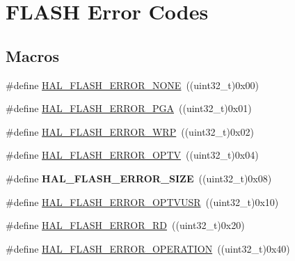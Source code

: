 \hypertarget{group___f_l_a_s_h___error___codes}{\section{F\-L\-A\-S\-H Error Codes}
\label{group___f_l_a_s_h___error___codes}
}
\subsection*{Macros}
\begin{DoxyCompactItemize}
\item 
\#define \hyperlink{group___f_l_a_s_h___error___codes_gae7fb9ee7198d393aba27ade3a9f50a70}{H\-A\-L\-\_\-\-F\-L\-A\-S\-H\-\_\-\-E\-R\-R\-O\-R\-\_\-\-N\-O\-N\-E}~((uint32\-\_\-t)0x00)
\item 
\#define \hyperlink{group___f_l_a_s_h___error___codes_gad9f62b6567543610f667bce580550662}{H\-A\-L\-\_\-\-F\-L\-A\-S\-H\-\_\-\-E\-R\-R\-O\-R\-\_\-\-P\-G\-A}~((uint32\-\_\-t)0x01)
\item 
\#define \hyperlink{group___f_l_a_s_h___error___codes_ga27e871d85f9311272098315bc3723075}{H\-A\-L\-\_\-\-F\-L\-A\-S\-H\-\_\-\-E\-R\-R\-O\-R\-\_\-\-W\-R\-P}~((uint32\-\_\-t)0x02)
\item 
\#define \hyperlink{group___f_l_a_s_h___error___codes_ga9fe984a57c2e92c27c4217468d1b2d93}{H\-A\-L\-\_\-\-F\-L\-A\-S\-H\-\_\-\-E\-R\-R\-O\-R\-\_\-\-O\-P\-T\-V}~((uint32\-\_\-t)0x04)
\item 
\hypertarget{group___f_l_a_s_h___error___codes_ga5a4cfea2cc3714b711c575e4785b006e}{\#define {\bfseries H\-A\-L\-\_\-\-F\-L\-A\-S\-H\-\_\-\-E\-R\-R\-O\-R\-\_\-\-S\-I\-Z\-E}~((uint32\-\_\-t)0x08)}\label{group___f_l_a_s_h___error___codes_ga5a4cfea2cc3714b711c575e4785b006e}

\item 
\#define \hyperlink{group___f_l_a_s_h___error___codes_ga066064877301300d84cd3b694251143b}{H\-A\-L\-\_\-\-F\-L\-A\-S\-H\-\_\-\-E\-R\-R\-O\-R\-\_\-\-O\-P\-T\-V\-U\-S\-R}~((uint32\-\_\-t)0x10)
\item 
\#define \hyperlink{group___f_l_a_s_h___error___codes_ga33008f2ad5085cd4158dd260fb2d124d}{H\-A\-L\-\_\-\-F\-L\-A\-S\-H\-\_\-\-E\-R\-R\-O\-R\-\_\-\-R\-D}~((uint32\-\_\-t)0x20)
\item 
\#define \hyperlink{group___f_l_a_s_h___error___codes_gafa1433e0ca2366478928c04244310d44}{H\-A\-L\-\_\-\-F\-L\-A\-S\-H\-\_\-\-E\-R\-R\-O\-R\-\_\-\-O\-P\-E\-R\-A\-T\-I\-O\-N}~((uint32\-\_\-t)0x40)
\end{DoxyCompactItemize}


